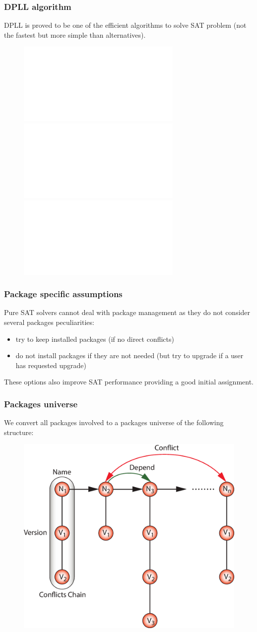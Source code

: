 \documentclass{beamer}
\begin{document}
\begin{frame}
\frametitle{DPLL algorithm}
DPLL is proved to be one of the efficient algorithms to solve SAT problem (not
the fastest but more simple than alternatives).
\begin{figure}[h!]
  \centering
  \includegraphics<1>[height=0.5\textheight]{dpll1.pdf}
  \includegraphics<2>[height=0.5\textheight]{dpll2.pdf}
  \includegraphics<3>[height=0.5\textheight]{dpll3.pdf}
\end{figure}
\end{frame}

\begin{frame}
\frametitle{Package specific assumptions}
Pure SAT solvers cannot deal with package management as they do not consider
several packages peculiarities:
\begin{itemize}
  \item try to keep installed packages (if no direct conflicts)
  \item do not install packages if they are not needed (but try to upgrade if a
  user has requested upgrade)
\end{itemize}
These options also improve SAT performance providing a good initial assignment.
\end{frame}

\begin{frame}
\frametitle{Packages universe}
We convert all packages involved to a packages universe of the following
structure:
\begin{figure}[h!]
  \centering
  \includegraphics[height=0.7\textheight]{q5.eps}
\end{figure}
\end{frame}
\end{document}
